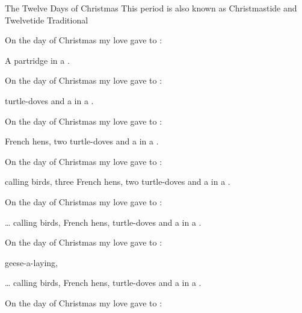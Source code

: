 \begin{SBSong}{The Twelve Days of Christmas}
  {This period is also known as Christmastide and Twelvetide}
  {Traditional}
  \begin{SBVerse}
	On the  day of Christmas my  love gave to :

	A partridge in a  .
  \end{SBVerse}
  \begin{SBVerse}
	On the  day of Christmas my  love gave to :

	 turtle-doves and a  in a  .
  \end{SBVerse}
  \begin{SBVerse}
	On the  day of Christmas my  love gave to :

	 French hens, 
	two turtle-doves 
    and a  in a  .
  \end{SBVerse}
  \begin{SBVerse}
	On the  day of Christmas my  love gave to :

	 calling birds, 
	three French hens, 
	two turtle-doves 
    and a  in a  .
  \end{SBVerse}
  \WBPageBrk
  \begin{SBVerse}
	On the  day of Christmas my  love gave to :

	  \ldots 
	 calling birds, 
	 French hens, 
	 turtle-doves 
    and a  in a  .
  \end{SBVerse}
  \begin{SBVerse}
	On the  day of Christmas my  love gave to :

	 geese-a-laying,
	
	  \ldots 
	 calling birds, 
	 French hens, 
	 turtle-doves 
    and a  in a  .
  \end{SBVerse}
  \begin{SBVerse}
	On the  day of Christmas my  love gave to :


\end{SBVerse}
\end{SBSong}
